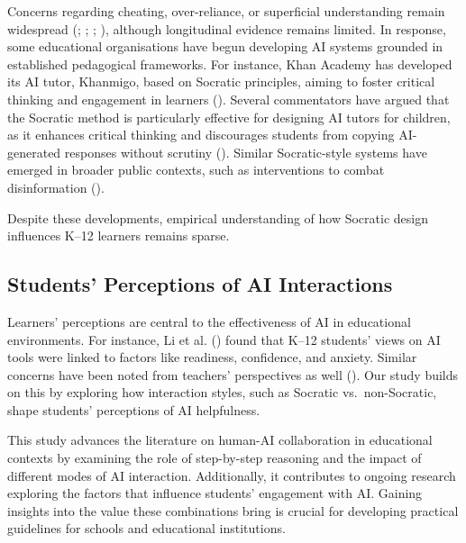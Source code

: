 \documentclass[
  12pt,
]{article}
\begin{document}
Concerns regarding cheating, over-reliance, or superficial understanding remain widespread (; ; ; ), although longitudinal evidence remains limited. In response, some educational organisations have begun developing AI systems grounded in established pedagogical frameworks. For instance, Khan Academy has developed its AI tutor, Khanmigo, based on Socratic principles, aiming to foster critical thinking and engagement in learners (). Several commentators have argued that the Socratic method is particularly effective for designing AI tutors for children, as it enhances critical thinking and discourages students from copying AI-generated responses without scrutiny (). Similar Socratic-style systems have emerged in broader public contexts, such as interventions to combat disinformation ().

Despite these developments, empirical understanding of how Socratic design influences K--12 learners remains sparse.

\subsection{Students' Perceptions of AI Interactions}\label{students-perceptions-of-ai-interactions}

Learners' perceptions are central to the effectiveness of AI in educational environments. For instance, Li et al. () found that K--12 students' views on AI tools were linked to factors like readiness, confidence, and anxiety. Similar concerns have been noted from teachers' perspectives as well (). Our study builds on this by exploring how interaction styles, such as Socratic vs.~non-Socratic, shape students' perceptions of AI helpfulness.

This study advances the literature on human-AI collaboration in educational contexts by examining the role of step-by-step reasoning and the impact of different modes of AI interaction. Additionally, it contributes to ongoing research exploring the factors that influence students' engagement with AI. Gaining insights into the value these combinations bring is crucial for developing practical guidelines for schools and educational institutions.
\end{document}
